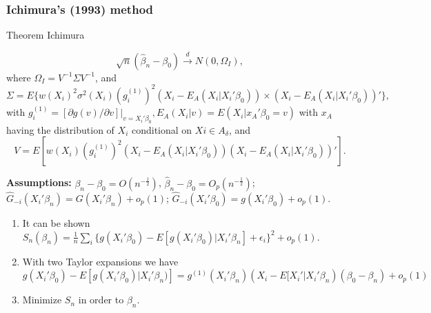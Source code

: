 \documentclass{beamer}
\begin{document}

\begin{frame}
\frametitle{Ichimura's (1993) method}
\begin{block}{Theorem Ichimura}
{\footnotesize \[ \sqrt{n}(\hat{\beta}_n - \beta_0) \stackrel{d}{\rightarrow} N(0,\Omega_I), \] where $\Omega_I = V^{-1}\Sigma V^{-1}$, and \[\Sigma = E\{w(X_i)^2\sigma^2(X_i)(g_i^{(1)})^2(X_i - E_A(X_i|X_i'\beta_0)) \times (X_i - E_A(X_i|X_i'\beta_0))'\},\] with $g_i^{(1)} = [\partial g(v)/\partial v]|_{v = X_i'\beta_0}, E_A(X_i|v) = E(X_i|x_A'\beta_0 = v)$ with $x_A$ having the distribution of $X_i$ conditional on $Xi \in A_\delta$, and \[ V = E[w(X_i)(g_i^{(1)})^2(X_i - E_A(X_i|X_i'\beta_0))(X_i - E_A(X_i|X_i'\beta_0))'].\] \par}
\end{block}

{\footnotesize \textbf{Assumptions:} $\beta_n - \beta_0 = O(n^{-\frac{1}{2}})$, $\hat{\beta}_n - \beta_0 = O_p(n^{-\frac{1}{2}})$; $ \hat{G}_{-i}(X_i'\beta_n) = G(X_i'\beta_n) + o_p(1)$; $\hat{G}_{-i}(X_i'\beta_0) = g(X_i'\beta_0) + o_p(1)$. \par}
\begin{enumerate}
	\item It can be shown $ S_{n}(\beta_n) = \frac{1}{n}\sum_i \{ g(X_i'\beta_0) - E[g(X_i'\beta_0)|X_i'\beta_n] +  \epsilon_i\}^2 + o_p(1)$.	
	\item With two Taylor expansions we have
$g(X_i'\beta_0) - E[g(X_i'\beta_0)|X_i'\beta_n)] 
 = g^{(1)}(X_i'\beta_n)( X_i - E[X_i'|X_i'\beta_n)(\beta_0 - \beta_n) + o_p(1)$
	\item Minimize $S_n$ in order to $\beta_n$.

\end{enumerate}

\end{frame}
\end{document}
